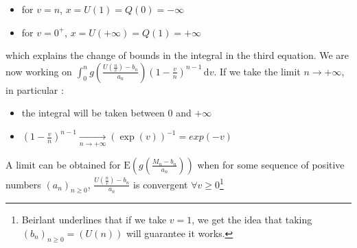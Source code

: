 \begin{itemize}
	\item for $v = n$, $x = U(1) = Q(0) = -\infty$
	\item for $v = 0^+$, $x = U(+\infty) = Q(1) = +\infty$
\end{itemize}\newline which explains the change of bounds in the integral in the third equation. We are now working on $\int_0^n \! g(\frac{U(\frac{n}{v}) - b_n}{a_n}) (1 - \frac{v}{n})^{n - 1}\, \mathrm{d}v$. If we take the limit $n \rightarrow +\infty$, in particular :
\begin{itemize}
	\item the integral will be taken between $0$ and $+\infty$
	\item $(1 - \frac{v}{n})^{n - 1} \xrightarrow[n \rightarrow + \infty]{} (\exp(v))^{-1} = exp(-v)$
\end{itemize}\newline A limit can be obtained for $\mathrm{E}(g(\frac{M_n - b_n}{a_n}))$ when for some sequence of positive numbers $(a_n)_{n \ge 0}$, $\frac{U(\frac{n}{v}) - b_n}{a_n}$ is convergent $\forall v \ge 0$\footnote{Beirlant underlines that if we take $v = 1$, we get the idea that taking $(b_n)_{n \ge 0} = (U(n))$ will guarantee it works.}

